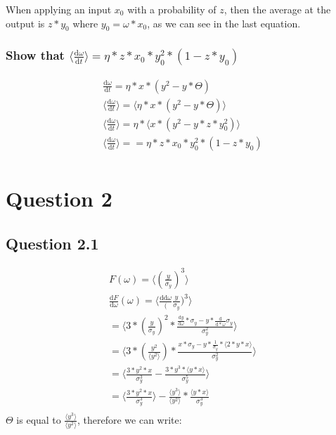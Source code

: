 When applying an input $x_0$ with a probability of $z$, then the average at the output is $z * y_0$ where $y_0 = \omega * x_0$, as we can see in the last equation.

\subsubsection{Show that $\langle \frac{\mathrm{d}\omega}{\mathrm{d}t} \rangle = \eta * z * x_0 * y_0^2 * (1 - z * y_0)$}

\begin{align*}
	\frac{\mathrm{d}\omega}{\mathrm{d}t} = \eta * x * (y^2 - y * \Theta) \\
	\langle \frac{\mathrm{d}\omega}{\mathrm{d}t} \rangle = \langle \eta * x * (y^2 - y * \Theta) \rangle \\
	\langle \frac{\mathrm{d}\omega}{\mathrm{d}t} \rangle = \eta * \langle x * (y^2 - y * z * y_0^2) \rangle \\
	\langle \frac{\mathrm{d}\omega}{\mathrm{d}t} \rangle = = \eta * z * x_0 * y_0^2 * (1- z * y_0) \\
\end{align*}

\section{Question 2}

\subsection{Question 2.1}

\begin{align*}
	F(\omega) = \langle (\frac{y}{\sigma_y})^3 \rangle \\
	\frac{\mathrm{d}F}{\mathrm{d}\omega}(\omega) = \langle \frac{\mathrm{d}{\mathrm{d}\omega}}(\frac{y}{\sigma_y})^3 \rangle \\
	= \langle 3 * (\frac{y}{\sigma_y})^2 * \frac{\frac{\mathrm{d}y}{\mathrm{d}\omega}*\sigma_y - y * \frac{\mathrm{d}}{\mathrm{d}*\omega}\sigma_y}{\sigma_y^2} \rangle \\
	= \langle 3 * (\frac{y^2}{\langle y^2 \rangle}) * \frac{x* \sigma_y - y * \frac{1}{\sigma_y} * \langle 2 * y * x \rangle}{\sigma_y^2} \rangle \\
	= \langle \frac{3 * y^2 * x}{\sigma_y^3} - \frac{3 * y^3 * \langle y * x \rangle}{\sigma_y^5} \rangle \\
	= \langle \frac{3 * y^2 * x}{\sigma_y^3} \rangle - \frac{\langle y^3 \rangle}{\langle y^2 \rangle} * \frac{\langle y * x \rangle}{\sigma_y^3} \\
\end{align*}
$\Theta$ is equal to $\frac{\langle y^3 \rangle}{\langle y^2 \rangle}$, therefore we can write:

